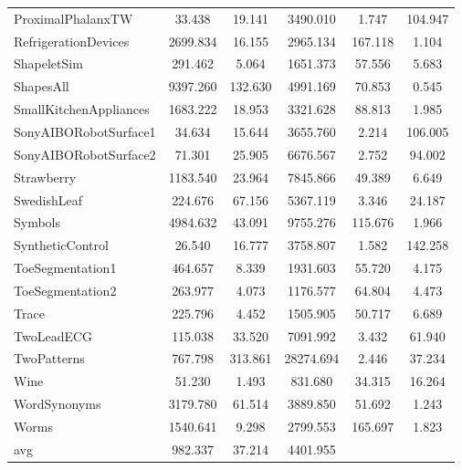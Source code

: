\begin{table}[ht]
\begin{adjustbox}{width=0.7\textwidth,center}
\begin{tabular}{lccccc}
        ProximalPhalanxTW & 33.438 & 19.141 & 3490.010 & 1.747 & 104.947 \\
        RefrigerationDevices & 2699.834 & 16.155 & 2965.134 & 167.118 & 1.104 \\
        ShapeletSim & 291.462 & 5.064 & 1651.373 & 57.556 & 5.683 \\
        ShapesAll & 9397.260 & 132.630 & 4991.169 & 70.853 & 0.545 \\
        SmallKitchenAppliances & 1683.222 & 18.953 & 3321.628 & 88.813 & 1.985 \\
        SonyAIBORobotSurface1 & 34.634 & 15.644 & 3655.760 & 2.214 & 106.005 \\
        SonyAIBORobotSurface2 & 71.301 & 25.905 & 6676.567 & 2.752 & 94.002 \\
        Strawberry & 1183.540 & 23.964 & 7845.866 & 49.389 & 6.649 \\
        SwedishLeaf & 224.676 & 67.156 & 5367.119 & 3.346 & 24.187 \\
        Symbols & 4984.632 & 43.091 & 9755.276 & 115.676 & 1.966 \\
        SyntheticControl & 26.540 & 16.777 & 3758.807 & 1.582 & 142.258 \\
        ToeSegmentation1 & 464.657 & 8.339 & 1931.603 & 55.720 & 4.175 \\
        ToeSegmentation2 & 263.977 & 4.073 & 1176.577 & 64.804 & 4.473 \\
        Trace & 225.796 & 4.452 & 1505.905 & 50.717 & 6.689 \\
        TwoLeadECG & 115.038 & 33.520 & 7091.992 & 3.432 & 61.940 \\
        TwoPatterns & 767.798 & 313.861 & 28274.694 & 2.446 & 37.234 \\
        Wine & 51.230 & 1.493 & 831.680 & 34.315 & 16.264 \\
        WordSynonyms & 3179.780 & 61.514 & 3889.850 & 51.692 & 1.243 \\
        Worms & 1540.641 & 9.298 & 2799.553 & 165.697 & 1.823 \\
        \hline 
        avg & 982.337 & 37.214 & 4401.955 \\ 
        \hline
        \end{tabular}
        \end{adjustbox}
        \end{table}
    